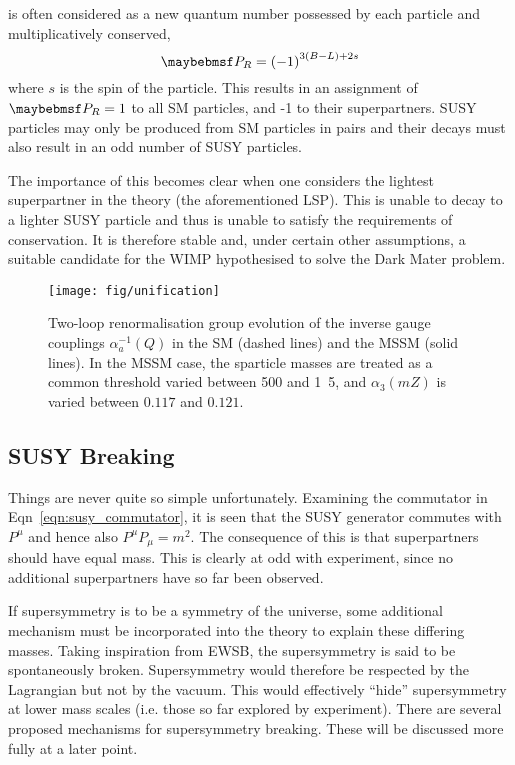 \Rparity is often considered as a new quantum number possessed by each particle
and multiplicatively conserved,
\begin{equation}
\PR = \left(-1\right)^{3(B-L)+2s}
\end{equation}
where $s$ is the spin of the particle. This results in an assignment of $\PR =
1$ to all \ac{SM} particles, and -1 to their superpartners. \ac{SUSY} particles
may only be produced from \ac{SM} particles in pairs and their decays must also
result in an odd number of \ac{SUSY} particles.

The importance of this becomes clear when one considers the lightest
superpartner in the theory (the aforementioned \ac{LSP}). This is unable to
decay to a lighter \ac{SUSY} particle and thus is unable to satisfy the
requirements of \Rparity conservation. It is therefore stable and, under certain
other assumptions, a suitable candidate for the \ac{WIMP} hypothesised to solve
the Dark Mater problem.

\begin{figure}
\centering
\texttt{[image: fig/unification]}
\caption{Two-loop renormalisation group evolution of the inverse gauge couplings
  $\alpha_a^{−1}(Q)$ in the \ac{SM} (dashed lines) and the MSSM (solid
  lines). In the MSSM case, the sparticle masses are treated as a common
  threshold varied between \unit{500}{\GeV} and \unit{1.5}{\TeV}, and
  $\alpha_3(mZ)$ is varied between $0.117$ and $0.121$. \cite{susy_primer}}
\label{fig:susy_gauge_unification}
\end{figure}

\subsection{\ac{SUSY} Breaking}
Things are never quite so simple unfortunately. Examining the commutator in
Eqn~\ref{eqn:susy_commutator}, it is seen that the \ac{SUSY} generator \Qa
commutes with $P^{\mu}$ and hence also $P^{\mu}P_{\mu} = m^2$. The consequence
of this is that superpartners should have equal mass. This is clearly at odd
with experiment, since no additional superpartners have so far been
observed.

If supersymmetry is to be a symmetry of the universe, some additional mechanism
must be incorporated into the theory to explain these differing masses. Taking
inspiration from \ac{EWSB}, the supersymmetry is said to be spontaneously
broken. Supersymmetry would therefore be respected by the Lagrangian but not by
the vacuum. This would effectively ``hide'' supersymmetry at lower mass scales
(i.e. those so far explored by experiment). There are several proposed
mechanisms for supersymmetry breaking. These will be discussed more fully at a
later point.

